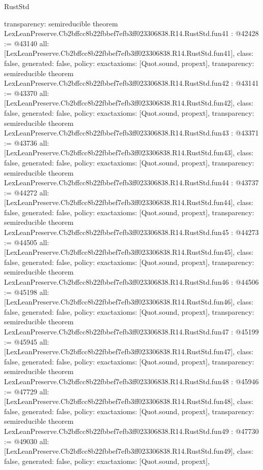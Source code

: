 \begin{lexlean}{RustStd}
\begin{coremodule}
{  transparency: semireducible
}
theorem LexLeanPreserve.Cb2bffcc8b22fbbef7efb3ff023306838.R14.RustStd.fun41 : @42428 := @43140 {
  all: [LexLeanPreserve.Cb2bffcc8b22fbbef7efb3ff023306838.R14.RustStd.fun41],
  class: false,
  generated: false,
  policy: exact{axioms: [Quot.sound, propext]},
  transparency: semireducible
}
theorem LexLeanPreserve.Cb2bffcc8b22fbbef7efb3ff023306838.R14.RustStd.fun42 : @43141 := @43370 {
  all: [LexLeanPreserve.Cb2bffcc8b22fbbef7efb3ff023306838.R14.RustStd.fun42],
  class: false,
  generated: false,
  policy: exact{axioms: [Quot.sound, propext]},
  transparency: semireducible
}
theorem LexLeanPreserve.Cb2bffcc8b22fbbef7efb3ff023306838.R14.RustStd.fun43 : @43371 := @43736 {
  all: [LexLeanPreserve.Cb2bffcc8b22fbbef7efb3ff023306838.R14.RustStd.fun43],
  class: false,
  generated: false,
  policy: exact{axioms: [Quot.sound, propext]},
  transparency: semireducible
}
theorem LexLeanPreserve.Cb2bffcc8b22fbbef7efb3ff023306838.R14.RustStd.fun44 : @43737 := @44272 {
  all: [LexLeanPreserve.Cb2bffcc8b22fbbef7efb3ff023306838.R14.RustStd.fun44],
  class: false,
  generated: false,
  policy: exact{axioms: [Quot.sound, propext]},
  transparency: semireducible
}
theorem LexLeanPreserve.Cb2bffcc8b22fbbef7efb3ff023306838.R14.RustStd.fun45 : @44273 := @44505 {
  all: [LexLeanPreserve.Cb2bffcc8b22fbbef7efb3ff023306838.R14.RustStd.fun45],
  class: false,
  generated: false,
  policy: exact{axioms: [Quot.sound, propext]},
  transparency: semireducible
}
theorem LexLeanPreserve.Cb2bffcc8b22fbbef7efb3ff023306838.R14.RustStd.fun46 : @44506 := @45198 {
  all: [LexLeanPreserve.Cb2bffcc8b22fbbef7efb3ff023306838.R14.RustStd.fun46],
  class: false,
  generated: false,
  policy: exact{axioms: [Quot.sound, propext]},
  transparency: semireducible
}
theorem LexLeanPreserve.Cb2bffcc8b22fbbef7efb3ff023306838.R14.RustStd.fun47 : @45199 := @45945 {
  all: [LexLeanPreserve.Cb2bffcc8b22fbbef7efb3ff023306838.R14.RustStd.fun47],
  class: false,
  generated: false,
  policy: exact{axioms: [Quot.sound, propext]},
  transparency: semireducible
}
theorem LexLeanPreserve.Cb2bffcc8b22fbbef7efb3ff023306838.R14.RustStd.fun48 : @45946 := @47729 {
  all: [LexLeanPreserve.Cb2bffcc8b22fbbef7efb3ff023306838.R14.RustStd.fun48],
  class: false,
  generated: false,
  policy: exact{axioms: [Quot.sound, propext]},
  transparency: semireducible
}
theorem LexLeanPreserve.Cb2bffcc8b22fbbef7efb3ff023306838.R14.RustStd.fun49 : @47730 := @49030 {
  all: [LexLeanPreserve.Cb2bffcc8b22fbbef7efb3ff023306838.R14.RustStd.fun49],
  class: false,
  generated: false,
  policy: exact{axioms: [Quot.sound, propext]},
}
\end{coremodule}
\end{lexlean}
